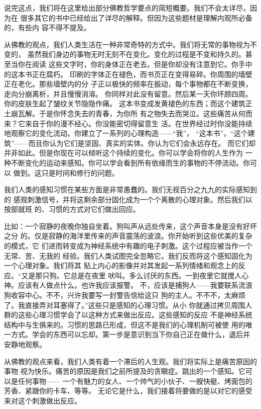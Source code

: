说完这点，我们将在这里给出部分佛教哲学要点的简短概要。我们不会太详尽，因为在
很多其它的书中已经给出了详尽的解释。但因为这些题材是理解内观所必备的，有些内
容不得不提及。

从佛教的观点，我们人类生活在一种非常奇特的方式中。我们将无常的事物视为不变的，
虽然我们身边的事物无时无刻不在变化。变化的过程是不变和持久的。甚至当你在阅读
这些文字时，你的身体正在老去。但是你却没有注意到它。你手中的这本书正在腐朽。
印刷的字体正在褪色，而书页正在变得易碎。你周围的墙壁正在老化。那些墙壁内的分
子正以极快的频率在振动，每个事物都在不断变换，走向分崩离析，\1并且慢慢消溶。
你同样对此没有留意。然后某一天你环顾四周。你的皮肤生起了皱纹关节隐隐作痛。
这本书变成发黄褪色的东西；而这个建筑正土崩瓦解。于是你怀念失去的青春，为你所
有之物失去而哭泣。这些痛苦从何而来？它来自于你的漫不经心。你没能密切得留意生
活。在世界经过时你没能持续地观察它的变化流动。你建立了一系列的心理构造——“我”，
“这本书”，“这个建筑”——而且你认为它们是坚固、真实的实体。你认为它们会永远存在。
而它们却并非如此。但是你现在可以倾听这个持续的变化。你可以学会将你的人生作为
一种不断变化的运动来感知。你可以学会看到所有依缘而生的事物的不停流动。你可以
做到。这只是时间和修行的问题。

我们人类的感知习惯在某些方面是非常愚蠢的。我们无视百分之九九的实际感知到的
感观刺激信号，并将这剩余部分固化成为一个个离散的心理对象。然后我们以按部就班
的、习惯的方式对它们做出回应。

比如：一个寂静的夜晚你独自坐着。狗叫声从远处传来，这个声音本身是没有好坏之分
的。仅是寂静的海洋里传来的声音震荡的波浪。你开始听到这些优美的复杂的模式，它
们进而转变成为神经系统中有趣的电子刺激。这个过程应被当作一个无常、苦、无我的
经验。我们人类试图完全忽略它。我们反而将这个感知固化为一个心理对象。我们将其
贴上内心的影像并对其发起一系列情绪和观念上的反应。“又是那只狗。它总是在夜里
吠叫。多么讨厌的东西。一到夜里它就搅人心神。应该有人做点什么。也许我应该报警。
不，应该是捕狗人——我要联系流浪狗收容中心。不不，兴许我要写一封\1警告信给这只
狗的主人。不不不，太麻烦了。我直接弄对耳塞得了。”这些只是感知的心理习惯。从小
你就通过拷贝周围人群的这些心理习惯学会了以这种方式来做出反应。这些感知的反应
不是神经系统结构中与生俱来的。习惯的思路已形成，但这不是我们的心理机制可被使
用的唯一方式。学会的东西可以忘却。第一步是意识到当下你自己正在做什么，退后并
安静地观察。

从佛教的观点来看，我们人类有着一个滞后的人生观。我们将实际上是痛苦原因的事物
视为快乐。痛苦的原因是我们之前所提及的贪瞋症。跳出的一个感知。它可以是任何事物——
一个有魅力的女人、一个帅气的小伙子、一艘快艇、烤面包的芳香、紧跟你的卡车、等等。
无论它是什么，我们接着将要做的是以对它的感受来对这个刺激做出反应。

